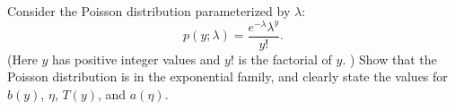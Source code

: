\item {} Consider the Poisson distribution parameterized by
$\lambda$:
%
\begin{equation*}
  p(y; \lambda) = \frac{e^{-\lambda}\lambda^y}{y!}.
\end{equation*}
%
(Here $y$ has positive integer values and $y!$ is the factorial of $y$. ) 
Show that the Poisson distribution is in the exponential family, and
clearly state the values for $b(y)$, $\eta$, $T(y)$, and $a(\eta)$.
